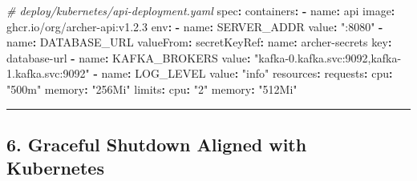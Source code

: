 \documentclass[
]{article}
\newenvironment{Shaded}{}{}
\newcommand{\AttributeTok}[1]{\textcolor[rgb]{0.49,0.56,0.16}{#1}}
\newcommand{\CommentTok}[1]{\textcolor[rgb]{0.38,0.63,0.69}{\textit{#1}}}
\newcommand{\FunctionTok}[1]{\textcolor[rgb]{0.02,0.16,0.49}{#1}}
\newcommand{\KeywordTok}[1]{\textcolor[rgb]{0.00,0.44,0.13}{\textbf{#1}}}
\newcommand{\StringTok}[1]{\textcolor[rgb]{0.25,0.44,0.63}{#1}}
\begin{document}
\begin{Shaded}
\begin{Highlighting}[]
\CommentTok{\# deploy/kubernetes/api{-}deployment.yaml}
\FunctionTok{spec}\KeywordTok{:}
\AttributeTok{  }\FunctionTok{containers}\KeywordTok{:}
\AttributeTok{  }\KeywordTok{{-}}\AttributeTok{ }\FunctionTok{name}\KeywordTok{:}\AttributeTok{ api}
\AttributeTok{    }\FunctionTok{image}\KeywordTok{:}\AttributeTok{ ghcr.io/org/archer{-}api:v1.2.3}
\AttributeTok{    }\FunctionTok{env}\KeywordTok{:}
\AttributeTok{    }\KeywordTok{{-}}\AttributeTok{ }\FunctionTok{name}\KeywordTok{:}\AttributeTok{ SERVER\_ADDR}
\AttributeTok{      }\FunctionTok{value}\KeywordTok{:}\AttributeTok{ }\StringTok{":8080"}
\AttributeTok{    }\KeywordTok{{-}}\AttributeTok{ }\FunctionTok{name}\KeywordTok{:}\AttributeTok{ DATABASE\_URL}
\AttributeTok{      }\FunctionTok{valueFrom}\KeywordTok{:}
\AttributeTok{        }\FunctionTok{secretKeyRef}\KeywordTok{:}
\AttributeTok{          }\FunctionTok{name}\KeywordTok{:}\AttributeTok{ archer{-}secrets}
\AttributeTok{          }\FunctionTok{key}\KeywordTok{:}\AttributeTok{ database{-}url}
\AttributeTok{    }\KeywordTok{{-}}\AttributeTok{ }\FunctionTok{name}\KeywordTok{:}\AttributeTok{ KAFKA\_BROKERS}
\AttributeTok{      }\FunctionTok{value}\KeywordTok{:}\AttributeTok{ }\StringTok{"kafka{-}0.kafka.svc:9092,kafka{-}1.kafka.svc:9092"}
\AttributeTok{    }\KeywordTok{{-}}\AttributeTok{ }\FunctionTok{name}\KeywordTok{:}\AttributeTok{ LOG\_LEVEL}
\AttributeTok{      }\FunctionTok{value}\KeywordTok{:}\AttributeTok{ }\StringTok{"info"}
\AttributeTok{    }\FunctionTok{resources}\KeywordTok{:}
\AttributeTok{      }\FunctionTok{requests}\KeywordTok{:}
\AttributeTok{        }\FunctionTok{cpu}\KeywordTok{:}\AttributeTok{ }\StringTok{"500m"}
\AttributeTok{        }\FunctionTok{memory}\KeywordTok{:}\AttributeTok{ }\StringTok{"256Mi"}
\AttributeTok{      }\FunctionTok{limits}\KeywordTok{:}
\AttributeTok{        }\FunctionTok{cpu}\KeywordTok{:}\AttributeTok{ }\StringTok{"2"}
\AttributeTok{        }\FunctionTok{memory}\KeywordTok{:}\AttributeTok{ }\StringTok{"512Mi"}
\end{Highlighting}
\end{Shaded}

\begin{center}\rule{0.5\linewidth}{0.5pt}\end{center}

\hypertarget{graceful-shutdown-aligned-with-kubernetes}{%
\subsection{6. Graceful Shutdown Aligned with
Kubernetes}\label{graceful-shutdown-aligned-with-kubernetes}}
\end{document}
